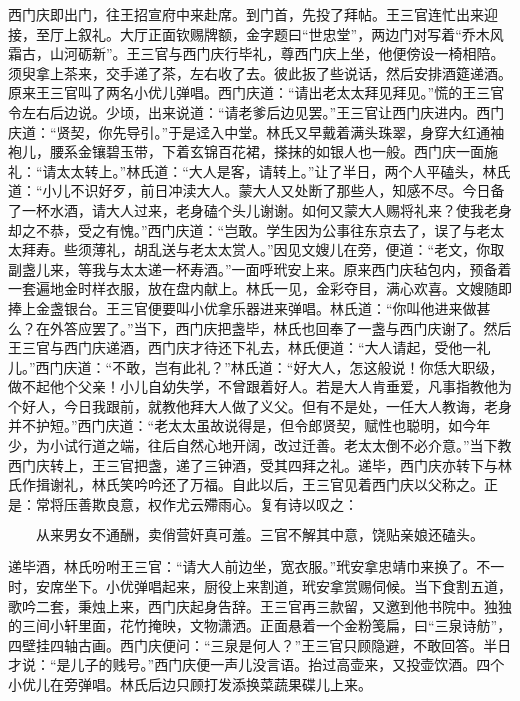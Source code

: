 西门庆即出门，往王招宣府中来赴席。到门首，先投了拜帖。王三官连忙出来迎接，至厅上叙礼。大厅正面钦赐牌额，金字题曰“世忠堂”，两边门对写着“乔木风霜古，山河\textShiDai 砺新”。王三官与西门庆行毕礼，尊西门庆上坐，他便傍设一椅相陪。须臾拿上茶来，交手递了茶，左右收了去。彼此扳了些说话，然后安排酒筵递酒。原来王三官叫了两名小优儿弹唱。西门庆道：“请出老太太拜见拜见。”慌的王三官令左右后边说。少顷，出来说道：“请老爹后边见罢。”王三官让西门庆进内。西门庆道：“贤契，你先导引。”于是迳入中堂。林氏又早戴着满头珠翠，身穿大红通袖袍儿，腰系金镶碧玉带，下着玄锦百花裙，搽抹的如银人也一般。西门庆一面施礼：“请太太转上。”林氏道：“大人是客，请转上。”让了半日，两个人平磕头，林氏道：“小儿不识好歹，前日冲渎大人。蒙大人又处断了那些人，知感不尽。今日备了一杯水酒，请大人过来，老身磕个头儿谢谢。如何又蒙大人赐将礼来？使我老身却之不恭，受之有愧。”西门庆道：“岂敢。学生因为公事往东京去了，误了与老太太拜寿。些须薄礼，胡乱送与老太太赏人。”因见文嫂儿在旁，便道：“老文，你取副盏儿来，等我与太太递一杯寿酒。”一面呼玳安上来。原来西门庆毡包内，预备着一套遍地金时样衣服，放在盘内献上。林氏一见，金彩夺目，满心欢喜。文嫂随即捧上金盏银台。王三官便要叫小优拿乐器进来弹唱。林氏道：“你叫他进来做甚么？在外答应罢了。”当下，西门庆把盏毕，林氏也回奉了一盏与西门庆谢了。然后王三官与西门庆递酒，西门庆才待还下礼去，林氏便道：“大人请起，受他一礼儿。”西门庆道：“不敢，岂有此礼？”林氏道：“好大人，怎这般说！你恁大职级，做不起他个父亲！小儿自幼失学，不曾跟着好人。若是大人肯垂爱，凡事指教他为个好人，今日我跟前，就教他拜大人做了义父。但有不是处，一任大人教诲，老身并不护短。”西门庆道：“老太太虽故说得是，但令郎贤契，赋性也聪明，如今年少，为小试行道之端，往后自然心地开阔，改过迁善。老太太倒不必介意。”当下教西门庆转上，王三官把盏，递了三钟酒，受其四拜之礼。递毕，西门庆亦转下与林氏作揖谢礼，林氏笑吟吟还了万福。自此以后，王三官见着西门庆以父称之。正是：常将压善欺良意，权作尤云殢雨心。复有诗以叹之：

\[
从来男女不通酬，卖俏营奸真可羞。
三官不解其中意，饶贴亲娘还磕头。
\]

递毕酒，林氏吩咐王三官：“请大人前边坐，宽衣服。”玳安拿忠靖巾来换了。不一时，安席坐下。小优弹唱起来，厨役上来割道，玳安拿赏赐伺候。当下食割五道，歌吟二套，秉烛上来，西门庆起身告辞。王三官再三款留，又邀到他书院中。独独的三间小轩里面，花竹掩映，文物潇洒。正面悬着一个金粉笺扁，曰“三泉诗舫”，四壁挂四轴古画。西门庆便问：“三泉是何人？”王三官只顾隐避，不敢回答。半日才说：“是儿子的贱号。”西门庆便一声儿没言语。抬过高壶来，又投壶饮酒。四个小优儿在旁弹唱。林氏后边只顾打发添换菜蔬果碟儿上来。

